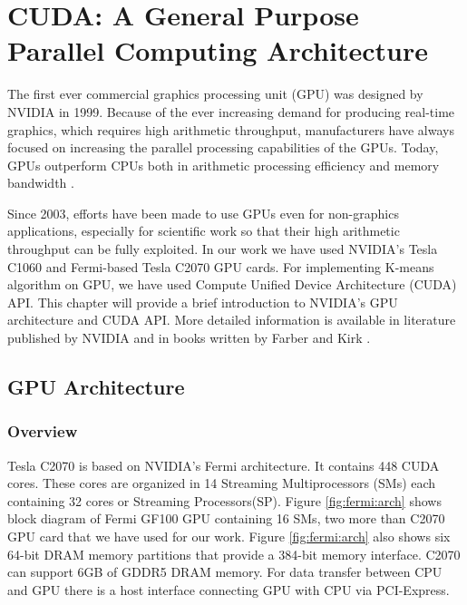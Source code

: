\chapter{CUDA: A General Purpose Parallel Computing Architecture}
The first ever commercial graphics processing unit (GPU) was designed by NVIDIA in 1999. Because of the ever increasing demand for producing real-time graphics, which requires high arithmetic throughput, manufacturers have always focused on increasing the parallel processing capabilities of the GPUs. Today, GPUs outperform CPUs both in arithmetic processing efficiency and memory bandwidth \cite{nickolls,glaskowsky}.

Since 2003, efforts have been made to use GPUs even for non-graphics applications, especially for scientific work so that their high arithmetic throughput can be fully exploited. In our work we have used NVIDIA's Tesla C1060 and Fermi-based Tesla C2070 GPU cards. For implementing K-means algorithm on GPU, we have used Compute Unified Device Architecture (CUDA) \cite{cuda} API. This chapter will provide a brief introduction to NVIDIA's GPU architecture and CUDA API. More detailed information is available in literature published by NVIDIA \cite{cudadocs,fermiWhitepaper} and in books written by Farber \cite{farber} and Kirk \cite{kirk}.

\section{GPU Architecture}
\subsection{Overview}
Tesla C2070 is based on NVIDIA's Fermi architecture. It contains 448 CUDA cores. These cores are organized in 14 Streaming Multiprocessors (SMs) each containing 32 cores or Streaming Processors(SP). Figure \ref{fig:fermi:arch} shows block diagram of Fermi GF100 GPU containing 16 SMs, two more than C2070 GPU card that we have used for our work. Figure \ref{fig:fermi:arch} also shows six 64-bit DRAM memory partitions that provide a 384-bit memory interface. C2070 can support 6GB of GDDR5 DRAM memory. For data transfer between CPU and GPU there is a host interface connecting GPU with CPU via PCI-Express.


